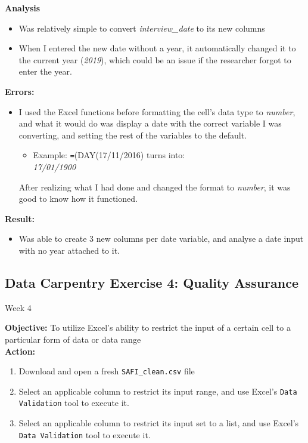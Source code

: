\documentclass{article}
\begin{document}
\textbf{Analysis}
\begin{itemize}
    \item Was relatively simple to convert \textit{interview\_date} to its new columns
    \item When I entered the new date without a year, it automatically changed it to the current year (\textit{2019}), which could be an issue if the researcher forgot to enter the year.
\end{itemize}
\textbf{Errors:}
\begin{itemize}
    \item I used the Excel functions before formatting the cell's data type to \textit{number}, and what it would do was display a date with the correct variable I was converting, and setting the rest of the variables to the default.
    \begin{itemize}
        \item Example: \verb|=|(DAY(17/11/2016) turns into:\\ \textit{17/01/1900}
    \end{itemize}
    After realizing what I had done and changed the format to \textit{number}, it was good to know how it functioned.
\end{itemize}
\textbf{Result:}
\begin{itemize}
    \item Was able to create 3 new columns per date variable, and analyse a date input with no year attached to it.
\end{itemize}
\newpage
\begin{center}
\section*{Data Carpentry Exercise 4: Quality Assurance}
Week 4
\end{center}
\textbf{Objective:} To utilize Excel's ability to restrict the input of a certain cell to a particular form of data or data range \\
\textbf{Action:}
\begin{enumerate}
    \item Download and open a fresh \verb|SAFI_clean.csv| file
    \item Select an applicable column to restrict its input range, and use Excel's \verb|Data Validation| tool to execute it.
    \item Select an applicable column to restrict its input set to a list, and use Excel's \verb|Data Validation| tool to execute it.
\end{enumerate}
\end{document}
